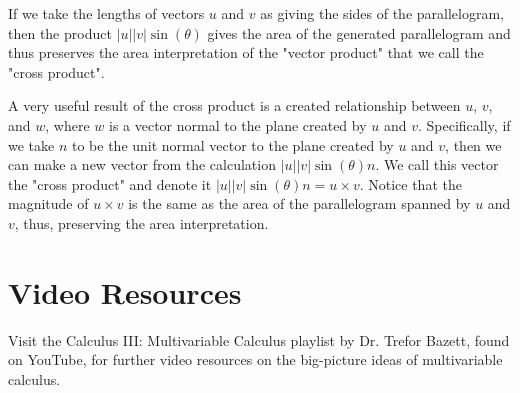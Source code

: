 \documentclass{ximera}
\begin{document}
If we take the lengths of vectors $u$ and $v$ as giving the sides of the parallelogram, then the product $|u||v|\sin(\theta)$ gives the area of the generated parallelogram and thus preserves the area interpretation of the "vector product" that we call the "cross product".

A very useful result of the cross product is a created relationship between $u$, $v$, and $w$, where $w$ is a vector normal to the plane created by $u$ and $v$. Specifically, if we take $n$ to be the unit normal vector to the plane created by $u$ and $v$, then we can make a new vector from the calculation $|u||v|\sin(\theta)n$. We call this vector the "cross product" and denote it $|u||v|\sin(\theta)n=u\times v$. Notice that the magnitude of $u\times v$ is the same as the area of the parallelogram spanned by $u$ and $v$, thus, preserving the area interpretation.



\section{Video Resources}


Visit the Calculus III: Multivariable Calculus playlist by Dr. Trefor Bazett, found on YouTube, for further video resources on the big-picture ideas of multivariable calculus.
\end{document}
